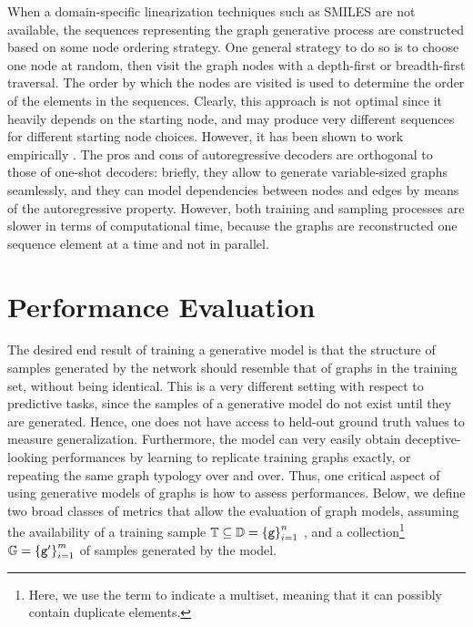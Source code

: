 When a domain-specific linearization techniques such as SMILES are not available, the sequences representing the graph generative process are constructed based on some node ordering strategy. One general strategy to do so is to choose one node at random, then visit the graph nodes with a depth-first or breadth-first traversal. The order by which the nodes are visited is used to determine the order of the elements in the sequences. Clearly, this approach is not optimal since it heavily depends on the starting node, and may produce very different sequences for different starting node choices. However, it has been shown to work empirically \citep{you2018graphrnn,li2018learningdeepgmg,bacciu2019edgegraphgenrnn,goyal2020graphgen}. The pros and cons of autoregressive decoders are orthogonal to those of one-shot decoders: briefly, they allow to generate variable-sized graphs seamlessly, and they can model dependencies between nodes and edges by means of the autoregressive property. However, both training and sampling processes are slower in terms of computational time, because the graphs are reconstructed one sequence element at a time and not in parallel.

\section{Performance Evaluation}\label{sec:evaluation-generative-graphs}
The desired end result of training a generative model is that the structure of samples generated by the network should resemble that of graphs in the training set, without being identical. This is a very different setting with respect to predictive tasks, since the samples of a generative model do not exist until they are generated. Hence, one does not have access to held-out ground truth values to measure generalization. Furthermore, the model can very easily obtain deceptive-looking performances by learning to replicate training graphs exactly, or repeating the same graph typology over and over. Thus, one critical aspect of using generative models of graphs is how to assess performances. Below, we define two broad classes of metrics that allow the evaluation of graph models, assuming the availability of a training sample $\mathbb{T} \subseteq \mathbb{D} = \left\{ \mathtt{g} \right\}_{i=1}^n$ , and a collection\footnote{Here, we use the term  to indicate a multiset, meaning that it can possibly contain duplicate elements.} $\mathbb{G} = \left\{ \mathtt{g'} \right\}_{i=1}^m$ of samples generated by the model.

